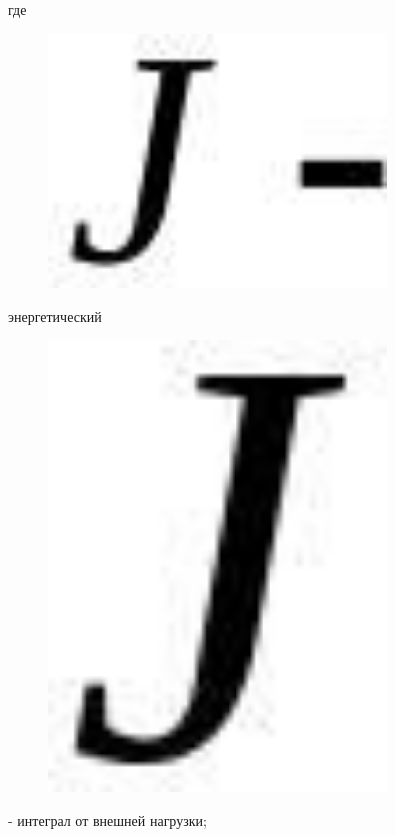 где \begin{figure}[H]
	\centering
	\includegraphics[width=0.8\textwidth]{assets/1222}
	\caption*{}
\end{figure}энергетический
\begin{figure}[H]
	\centering
	\includegraphics[width=0.8\textwidth]{assets/1223}
	\caption*{}
\end{figure} - интеграл от внешней нагрузки;
